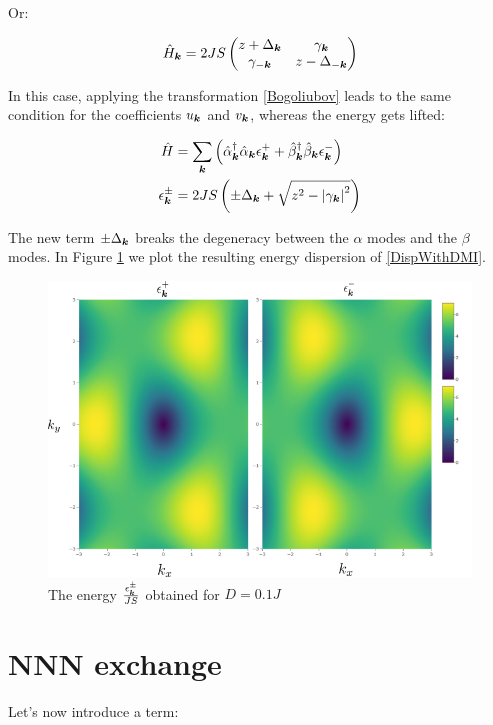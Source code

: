 Or:

\begin{equation}
\hat{H}_{\boldsymbol{k}} = 2JS\begin{pmatrix} 
z + \Delta_{\boldsymbol{k}}& \gamma_{\boldsymbol{k}} \\
\gamma_{-\boldsymbol{k}} & z - \Delta_{-\boldsymbol{k}}
\end{pmatrix}
\end{equation}

In this case, applying the transformation \ref{Bogoliubov} leads to the same condition for the coefficients  $u_{\boldsymbol{k}}$ and $v_{\boldsymbol{k}}$, whereas the energy gets lifted:

\begin{align}
\hat{H} &= \sum_{\boldsymbol{k}} \left( \hat{\alpha}_{\boldsymbol{k}}^\dagger \hat{\alpha}_{\boldsymbol{k}} \epsilon_{\boldsymbol{k}}^+ +\hat{\beta}_{\boldsymbol{k}}^\dagger \hat{\beta}_{\boldsymbol{k}}  \epsilon_{\boldsymbol{k}}^- \right) \label{DispWithDMI} \\
\epsilon_{\boldsymbol{k}}^\pm &= 2JS \left( \pm \Delta_{\boldsymbol{k}} + \sqrt{z^2-\abs{\gamma_{\boldsymbol{k}}}^2} \right)
\end{align}

The new term $\pm \Delta_{\boldsymbol{k}}$ breaks the degeneracy between the $\alpha$ modes and the $\beta$ modes. In Figure \ref{Fig.Magnon.Disp} we plot the resulting energy dispersion of \ref{DispWithDMI}.

\begin{figure}
\centering
  \includegraphics[width=0.7\linewidth]{../Figures/magnon_disp_2.png}
  \caption{The energy $\frac{\epsilon_{\boldsymbol{k}}^\pm}{JS}$ obtained for $D=0.1J$ }
\label{Fig.Magnon.Disp}
\end{figure}

\section{NNN exchange}

Let's now introduce a term:

